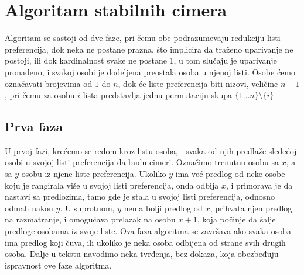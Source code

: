 \documentclass[a4paper]{article}
\begin{document}
\newpage

\section{Algoritam stabilnih cimera}
\label{sec:naslov1}

Algoritam se sastoji od dve faze, pri čemu obe podrazumevaju redukciju listi preferencija, dok neka ne postane prazna, što implicira da traženo uparivanje ne postoji, ili dok kardinalnost svake ne postane 1, u tom slučaju je uparivanje pronađeno, i svakoj osobi je dodeljena preostala osoba u njenoj listi. Osobe ćemo označavati brojevima od $1$ do $n$, dok će liste preferencija biti nizovi, veličine $n-1$, pri čemu za osobu $i$ lista predstavlja jednu permutaciju skupa $\{1 \ldots n\} \setminus \{i\}$.  


\subsection{Prva faza}

U prvoj fazi, krećemo se redom kroz listu osoba, i svaka od njih predlaže sledećoj osobi u svojoj listi preferencija da budu cimeri. Označimo trenutnu osobu sa $x$, a sa $y$ osobu iz njene liste preferencija. Ukoliko $y$ ima već predlog od neke osobe koju je rangirala više u svojoj listi preferencija, onda odbija $x$, i primorava je da nastavi sa predlozima, tamo gde je stala u svojoj listi preferencija, odnosno odmah nakon $y$. U suprotnom, $y$ nema bolji predlog od $x$, prihvata njen predlog na razmatranje, i omogućava prelazak na osobu $x+1$, koja počinje da šalje predloge osobama iz svoje liste.
\newline
Ova faza algoritma se završava ako svaka osoba ima predlog koji čuva, ili ukoliko je neka osoba odbijena od strane svih drugih osoba. 
\newline
Dalje u tekstu navodimo neka tvrđenja, bez dokaza, koja obezbeđuju ispravnost ove faze algoritma.
\end{document}
